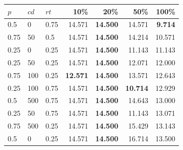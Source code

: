 \begin{tabular}{lllrrrr}
\toprule
\textbf{$p$} & \textbf{$cd$} & \textbf{$rt$} & \textbf{10\%} & \textbf{20\%} & \textbf{50\%} & \textbf{100\%} \\
\midrule
0.5 & 0 & 0.75 & 14.571 & \textbf{14.500} & 14.571 & \textbf{9.714} \\
0.75 & 50 & 0.5 & 14.571 & \textbf{14.500} & 14.214 & 10.571 \\
0.25 & 0 & 0.25 & 14.571 & \textbf{14.500} & 11.143 & 11.143 \\
0.25 & 50 & 0.25 & 14.571 & \textbf{14.500} & 12.071 & 12.000 \\
0.75 & 100 & 0.25 & \textbf{12.571} & \textbf{14.500} & 13.571 & 12.643 \\
0.25 & 100 & 0.75 & 14.571 & \textbf{14.500} & \textbf{10.714} & 12.929 \\
0.5 & 500 & 0.75 & 14.571 & \textbf{14.500} & 14.643 & 13.000 \\
0.25 & 50 & 0.75 & 14.571 & \textbf{14.500} & 11.143 & 13.071 \\
0.75 & 500 & 0.25 & 14.571 & \textbf{14.500} & 15.429 & 13.143 \\
0.5 & 0 & 0.25 & 14.571 & \textbf{14.500} & 16.714 & 13.500 \\
\bottomrule
\end{tabular}
